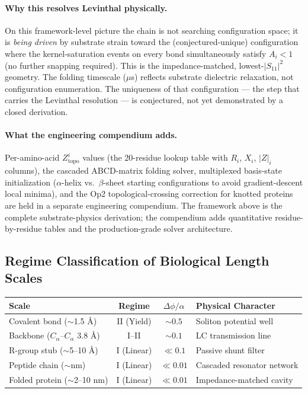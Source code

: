 \paragraph{Why this resolves Levinthal physically.} On this framework-level picture the chain is not searching configuration space; it is \emph{being driven} by substrate strain toward the (conjectured-unique) configuration where the kernel-saturation events on every bond simultaneously satisfy $A_i < 1$ (no further snapping required). This is the impedance-matched, lowest-$|S_{11}|^2$ geometry. The folding timescale ($\mu$s) reflects substrate dielectric relaxation, not configuration enumeration. The uniqueness of that configuration --- the step that carries the Levinthal resolution --- is conjectured, not yet demonstrated by a closed derivation.

\paragraph{What the engineering compendium adds.} Per-amino-acid $Z_{\text{topo}}^i$ values (the 20-residue lookup table with $R_i$, $X_i$, $|Z|_i$ columns), the cascaded ABCD-matrix folding solver, multiplexed basis-state initialization ($\alpha$-helix vs.\ $\beta$-sheet starting configurations to avoid gradient-descent local minima), and the Op2 topological-crossing correction for knotted proteins are held in a separate engineering compendium. The framework above is the complete substrate-physics derivation; the compendium adds quantitative residue-by-residue tables and the production-grade solver architecture.

\subsection*{Regime Classification of Biological Length Scales}
\begin{center}
\small
\renewcommand{\arraystretch}{1.2}
\begin{tabularx}{\textwidth}{@{}lccX@{}}
\toprule
\textbf{Scale} & \textbf{Regime} & \textbf{$\Delta\phi/\alpha$} & \textbf{Physical Character} \\
\midrule
Covalent bond ($\sim$1.5 \AA) & II (Yield) & $\sim 0.5$ & Soliton potential well \\
Backbone ($C_\alpha$--$C_\alpha$ 3.8 \AA) & I--II & $\sim 0.1$ & LC transmission line \\
R-group stub ($\sim$5--10 \AA) & I (Linear) & $\ll 0.1$ & Passive shunt filter \\
Peptide chain ($\sim$nm) & I (Linear) & $\ll 0.01$ & Cascaded resonator network \\
Folded protein ($\sim$2--10 nm) & I (Linear) & $\ll 0.01$ & Impedance-matched cavity \\
\bottomrule
\end{tabularx}
\end{center}

